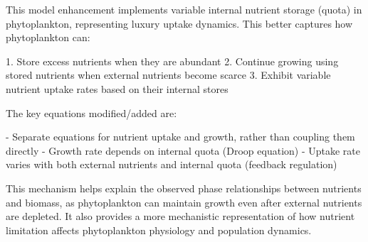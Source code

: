 This model enhancement implements variable internal nutrient storage (quota) in phytoplankton, representing luxury uptake dynamics. This better captures how phytoplankton can:

1. Store excess nutrients when they are abundant
2. Continue growing using stored nutrients when external nutrients become scarce
3. Exhibit variable nutrient uptake rates based on their internal stores

The key equations modified/added are:

- Separate equations for nutrient uptake and growth, rather than coupling them directly
- Growth rate depends on internal quota (Droop equation)
- Uptake rate varies with both external nutrients and internal quota (feedback regulation)

This mechanism helps explain the observed phase relationships between nutrients and biomass, as phytoplankton can maintain growth even after external nutrients are depleted. It also provides a more mechanistic representation of how nutrient limitation affects phytoplankton physiology and population dynamics.
